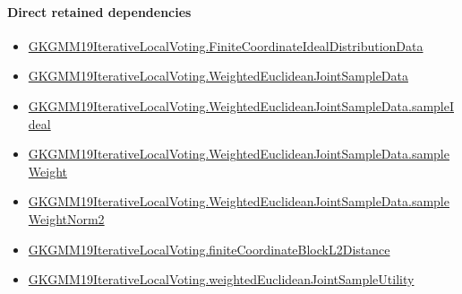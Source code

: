 \documentclass[10pt]{article}
\begin{document}
\paragraph{Direct retained dependencies}
\begin{itemize}\raggedright
\item \hyperlink{governing-declaration-57171116eb928bf6}{GKGMM19\allowbreak{}Iterative\allowbreak{}Local\allowbreak{}Voting.\allowbreak{}Finite\allowbreak{}Coordinate\allowbreak{}Ideal\allowbreak{}Distribution\allowbreak{}Data}
\item \hyperlink{governing-declaration-b9220a54a8f8ff22}{GKGMM19\allowbreak{}Iterative\allowbreak{}Local\allowbreak{}Voting.\allowbreak{}Weighted\allowbreak{}Euclidean\allowbreak{}Joint\allowbreak{}Sample\allowbreak{}Data}
\item \hyperlink{governing-declaration-0b3dd9036d7079b2}{GKGMM19\allowbreak{}Iterative\allowbreak{}Local\allowbreak{}Voting.\allowbreak{}Weighted\allowbreak{}Euclidean\allowbreak{}Joint\allowbreak{}Sample\allowbreak{}Data.\allowbreak{}sample\allowbreak{}Ideal}
\item \hyperlink{governing-declaration-1e78ab562ae896c2}{GKGMM19\allowbreak{}Iterative\allowbreak{}Local\allowbreak{}Voting.\allowbreak{}Weighted\allowbreak{}Euclidean\allowbreak{}Joint\allowbreak{}Sample\allowbreak{}Data.\allowbreak{}sample\allowbreak{}Weight}
\item \hyperlink{governing-declaration-69fe6a7a24e7eb9f}{GKGMM19\allowbreak{}Iterative\allowbreak{}Local\allowbreak{}Voting.\allowbreak{}Weighted\allowbreak{}Euclidean\allowbreak{}Joint\allowbreak{}Sample\allowbreak{}Data.\allowbreak{}sample\allowbreak{}Weight\allowbreak{}Norm2}
\item \hyperlink{governing-declaration-59eb81fa9b14c38b}{GKGMM19\allowbreak{}Iterative\allowbreak{}Local\allowbreak{}Voting.\allowbreak{}finite\allowbreak{}Coordinate\allowbreak{}Block\allowbreak{}L2\allowbreak{}Distance}
\item \hyperlink{governing-declaration-fce43aeb4bb1a48c}{GKGMM19\allowbreak{}Iterative\allowbreak{}Local\allowbreak{}Voting.\allowbreak{}weighted\allowbreak{}Euclidean\allowbreak{}Joint\allowbreak{}Sample\allowbreak{}Utility}
\end{itemize}
\end{document}
